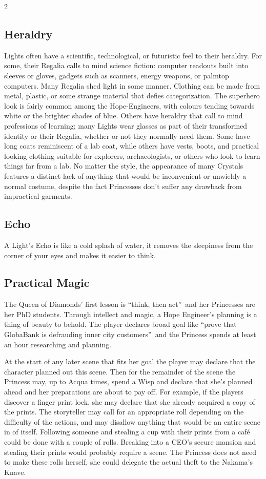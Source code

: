 \begin{multicols}{2}
\subsection*{Heraldry}
Lights often have a scientific, technological, or futuristic feel to their heraldry. For some, their Regalia calls to mind science fiction: computer readouts built into sleeves or gloves, gadgets such as scanners, energy weapons, or palmtop computers. Many Regalia shed light in some manner. Clothing can be made from metal, plastic, or some strange material that defies categorization. The superhero look is fairly common among the Hope-Engineers, with colours tending towards white or the brighter shades of blue. Others have heraldry that call to mind professions of learning; many Lights wear glasses as part of their transformed identity or their Regalia, whether or not they normally need them. Some have long coats reminiscent of a lab coat, while others have vests, boots, and practical looking clothing suitable for explorers, archaeologists, or others who look to learn things far from a lab. No matter the style, the appearance of many Crystals features a distinct lack of anything that would be inconvenient or 
unwieldy a normal costume, despite the fact 
Princesses don't suffer any drawback from impractical garments.

\subsection*{Echo}
A Light's Echo is like a cold splash of water, it removes the sleepiness from the corner of your eyes and makes it easier to think.

\subsection*{Practical Magic}

The Queen of Diamonds' first lesson is \textquotedblleft think, then act\textquotedblright\, and her Princesses are her PhD students. Through intellect and magic, a Hope Engineer's planning is a thing of beauty to behold. The player declares broad goal like \textquotedblleft prove that GlobaBank is defrauding inner city customers\textquotedblright\, and the Princess spends at least an hour researching and planning. 

At the start of any later scene that fits her goal the player may declare that the character planned out this scene. Then for the remainder of the scene the Princess may, up to Acqua times, spend a Wisp and declare that she's planned ahead and her preparations are about to pay off. For example, if the players discover a finger print lock, she may declare that she already acquired a copy of the prints. The storyteller may call for an appropriate roll depending on the difficulty of the actions, and may disallow anything that would be an entire scene in of itself. Following someone and stealing a cup with their prints from a caf\'{e} could be done with a couple of rolls. Breaking into a CEO's secure mansion and stealing their prints would probably require a scene. The Princess does not need to make these rolls herself, she could delegate the actual theft to the Nakama's Knave. 


\end{multicols}
